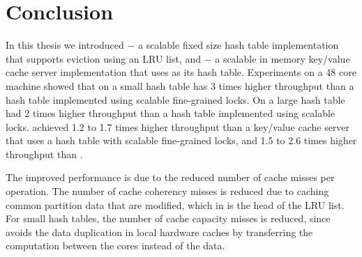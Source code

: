 \chapter{Conclusion}

In this thesis we introduced \cphash{} $-$ a scalable fixed size hash table implementation that supports eviction
using an LRU list, and \cpserver{} $-$ a scalable in memory key/value cache server implementation that uses \cphash{}
as its hash table. 
Experiments on a 48 core machine showed that on a small hash table \cphash{} has 3 times higher throughput than a hash
table implemented using scalable fine-grained locks. On a large hash table \cphash{} had 2 times higher throughput than
a hash table implemented using scalable locks. 
\cpserver{} achieved 1.2 to 1.7 times higher throughput than a key/value cache server 
that uses a hash table with scalable fine-grained locks, and 1.5 to 2.6 times higher throughput than \memcached{}.

The improved performance is due to the reduced number of cache misses per operation. The number of cache coherency misses
is reduced due to caching common partition data that are modified, which in \cphash{} is the head of the LRU list. 
For small hash tables, the number of cache capacity misses is reduced, since \cphash{} avoids the data duplication in local hardware
caches by transferring the computation between the cores instead of the data.

